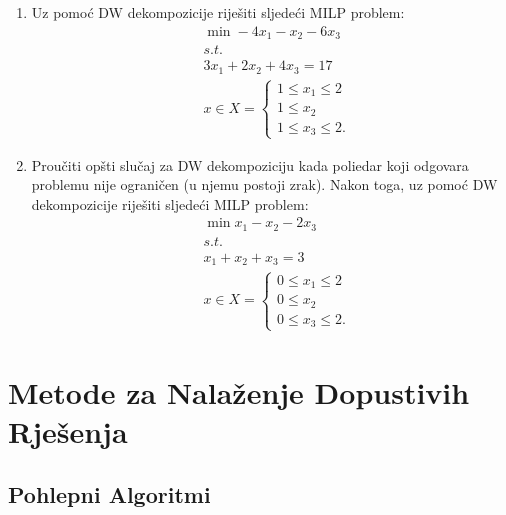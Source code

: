 \documentclass[a4paper, utf8, 11pt, colorlinks]{book}
\begin{document}
\begin{enumerate}
\item %
	Uz pomoć   DW dekompozicije riješiti sljedeći MILP problem:
\begin{align*}
	 &\min -4x_1 - x_2 - 6 x_3 \\
	 & s.t.\\
	 & 3 x_1 + 2 x_2 + 4 x_3 = 17 \\
	 & x \in X = \begin{cases}
	 	1 \leq x_1 \leq 2 \\
	 	1 \leq x_2 \\
	    1 \leq x_3 \leq 2. 
	 \end{cases}
\end{align*}
\item %
    Proučiti opšti slučaj za DW dekompoziciju kada poliedar koji odgovara problemu nije ograničen (u njemu postoji zrak). Nakon toga, uz pomoć DW dekompozicije riješiti sljedeći MILP problem:
	\begin{align*}
		 &\min x_1 - x_2 - 2 x_3 \\
		 & s.t. \\
		 & x_1 + x_2 + x_3 = 3 \\
		 & x \in X = \begin{cases}
		 	        0 \leq x_1 \leq 2 \\
		 	        0 \leq x_2 \\
		 	        0 \leq x_3 \leq 2. 
		 \end{cases}
	\end{align*}

\end{enumerate}



 \chapter{Metode za Nalaženje Dopustivih Rješenja}

\section{Pohlepni Algoritmi}
 
\end{document}
